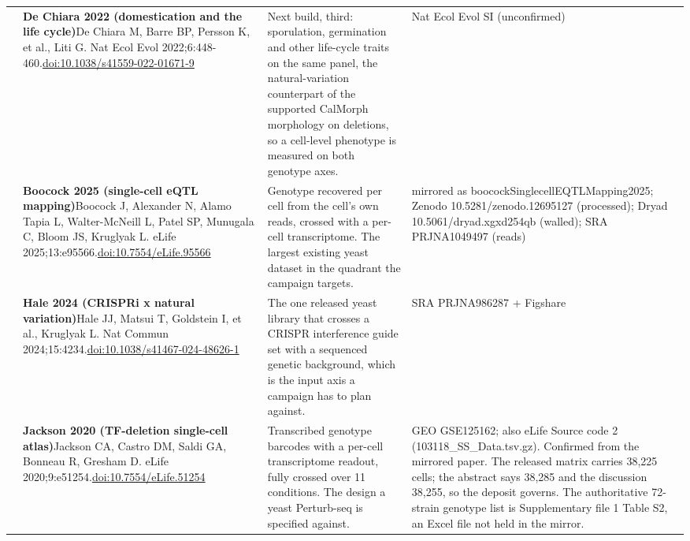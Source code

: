 \begin{landscape}
\begin{longtable}{@{}r@{\hspace{4pt}} L{86mm} L{92mm} L{62mm}@{}}
 & \textbf{De Chiara 2022 (domestication and the life cycle)}\newline De Chiara M, Barre BP, Persson K, et al., Liti G. Nat Ecol Evol 2022;6:448-460.\newline \href{https://doi.org/10.1038/s41559-022-01671-9}{doi:10.1038/\allowbreak s41559-022-01671-9} & Next build, third: sporulation, germination and other life-cycle traits on the same panel, the natural-variation counterpart of the supported CalMorph morphology on deletions, so a cell-level phenotype is measured on both genotype axes. & Nat Ecol Evol SI (unconfirmed) \\
 & \textbf{Boocock 2025 (single-cell eQTL mapping)}\newline Boocock J, Alexander N, Alamo Tapia L, Walter-McNeill L, Patel SP, Munugala C, Bloom JS, Kruglyak L. eLife 2025;13:e95566.\newline \href{https://doi.org/10.7554/eLife.95566}{doi:10.7554/\allowbreak eLife.95566} & Genotype recovered per cell from the cell's own reads, crossed with a per-cell transcriptome. The largest existing yeast dataset in the quadrant the campaign targets. & mirrored as boocockSinglecellEQTLMapping2025; Zenodo 10.5281/\allowbreak zenodo.12695127 (processed); Dryad 10.5061/\allowbreak dryad.xgxd254qb (walled); SRA PRJNA1049497 (reads) \\
 & \textbf{Hale 2024 (CRISPRi x natural variation)}\newline Hale JJ, Matsui T, Goldstein I, et al., Kruglyak L. Nat Commun 2024;15:4234.\newline \href{https://doi.org/10.1038/s41467-024-48626-1}{doi:10.1038/\allowbreak s41467-024-48626-1} & The one released yeast library that crosses a CRISPR interference guide set with a sequenced genetic background, which is the input axis a campaign has to plan against. & SRA PRJNA986287 + Figshare \\
 & \textbf{Jackson 2020 (TF-deletion single-cell atlas)}\newline Jackson CA, Castro DM, Saldi GA, Bonneau R, Gresham D. eLife 2020;9:e51254.\newline \href{https://doi.org/10.7554/eLife.51254}{doi:10.7554/\allowbreak eLife.51254} & Transcribed genotype barcodes with a per-cell transcriptome readout, fully crossed over 11 conditions. The design a yeast Perturb-seq is specified against. & GEO GSE125162; also eLife Source code 2 (103118\_SS\_Data.tsv.gz). Confirmed from the mirrored paper. The released matrix carries 38,225 cells; the abstract says 38,285 and the discussion 38,255, so the deposit governs. The authoritative 72-strain genotype list is Supplementary file 1 Table S2, an Excel file not held in the mirror. \\

\end{longtable}
\end{landscape}
